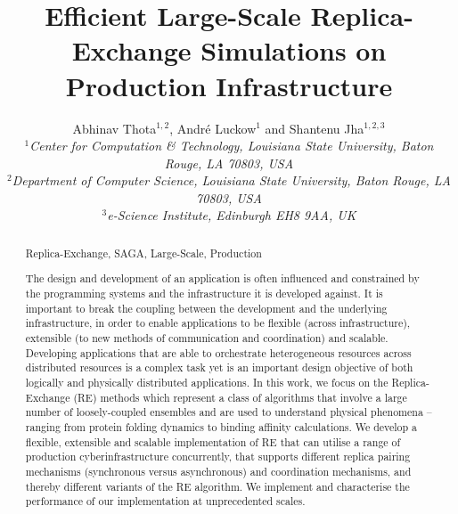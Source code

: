 \documentclass{rspublic}
\title[Efficient Large-Scale Replica-Exchange Simulations on
Production Infrastructure]{Efficient Large-Scale Replica-Exchange
  Simulations on Production Infrastructure}
\author[Thota, Luckow, Jha]{
  Abhinav Thota$^{1,2}$, Andr\'e Luckow$^{1}$ and Shantenu Jha$^{1,2,3}$\\
  \small{\emph{$^{1}$Center for Computation \& Technology, Louisiana State University, Baton Rouge, LA 70803, USA}}\\
  \small{\emph{$^{2}$Department of Computer Science, Louisiana State
      University, Baton Rouge, LA 70803, USA}}\\
  \small{\emph{$^{3}$e-Science Institute, Edinburgh EH8 9AA, UK}}\\
}
\begin{document}
 


\maketitle    

\begin{abstract}{Replica-Exchange, SAGA, Large-Scale, Production}  

  The design and development of an application is often influenced and
  constrained by the programming systems and the infrastructure it is
  developed against.  It is important to break the coupling between
  the development and the underlying infrastructure, in order to
  enable applications to be flexible (across infrastructure),
  extensible (to new methods of communication and coordination) and
  scalable.  Developing applications that are able to orchestrate
  heterogeneous resources across distributed resources is a complex
  task yet is an important design objective of both logically and
  physically distributed applications.  In this work, we focus on the
  Replica-Exchange (RE) methods which represent a class of algorithms
  that involve a large number of loosely-coupled ensembles and are
  used to understand physical phenomena -- ranging from protein
  folding dynamics to binding affinity calculations.  We develop a
  flexible, extensible and scalable implementation of RE that can
  utilise a range of production cyberinfrastructure concurrently, that
  supports different replica pairing mechanisms (synchronous versus
  asynchronous) and coordination mechanisms, and thereby different
  variants of the RE algorithm. We implement and characterise the
  performance of our implementation at unprecedented scales.



\end{abstract}
\end{document}
